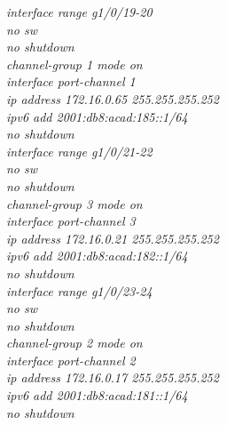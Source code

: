 \documentclass[12pt,a4paper]{report}
\begin{document}
\hspace*{2cm}\textit{interface range g1/0/19-20\\
\hspace*{2cm}no sw\\
\hspace*{2cm}no shutdown\\
\hspace*{2cm}channel-group 1 mode on \\
\hspace*{2cm}interface port-channel 1\\
\hspace*{2cm}ip address 172.16.0.65 255.255.255.252\\
\hspace*{2cm}ipv6 add 2001:db8:acad:185::1/64\\
\hspace*{2cm}no shutdown\\
\hspace*{2cm}interface range g1/0/21-22\\
\hspace*{2cm}no sw\\
\hspace*{2cm}no shutdown\\
\hspace*{2cm}channel-group 3 mode on \\
\hspace*{2cm}interface port-channel 3\\
\hspace*{2cm}ip address 172.16.0.21 255.255.255.252\\
\hspace*{2cm}ipv6 add 2001:db8:acad:182::1/64\\
\hspace*{2cm}no shutdown\\
\hspace*{2cm}interface range g1/0/23-24\\
\hspace*{2cm}no sw\\
\hspace*{2cm}no shutdown\\
\hspace*{2cm}channel-group 2 mode on \\
\hspace*{2cm}interface port-channel 2\\
\hspace*{2cm}ip address 172.16.0.17 255.255.255.252\\
\hspace*{2cm}ipv6 add 2001:db8:acad:181::1/64\\
\hspace*{2cm}no shutdown\\}
\end{document}
